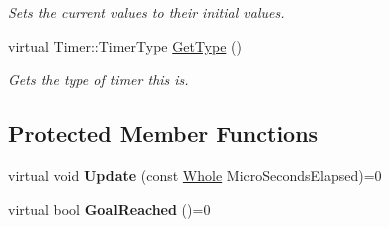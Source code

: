 \begin{DoxyCompactItemize}
\begin{DoxyCompactList}\small\item\em Sets the current values to their initial values. \item\end{DoxyCompactList}\item 
virtual Timer::TimerType \hyperlink{classphys_1_1Timer_af0eaa87bf3074047db36ba1c6fd33c70}{GetType} ()
\begin{DoxyCompactList}\small\item\em Gets the type of timer this is. \item\end{DoxyCompactList}\end{DoxyCompactItemize}
\subsection*{Protected Member Functions}
\begin{DoxyCompactItemize}
\item 
\hypertarget{classphys_1_1Timer_a45d7e290f9cb8c03f2376e48ff794f24}{
virtual void {\bfseries Update} (const \hyperlink{namespacephys_a460f6bc24c8dd347b05e0366ae34f34a}{Whole} MicroSecondsElapsed)=0}
\label{d3/d83/classphys_1_1Timer_a45d7e290f9cb8c03f2376e48ff794f24}

\item 
\hypertarget{classphys_1_1Timer_a636d546064abe43b1c549efaca777613}{
virtual bool {\bfseries GoalReached} ()=0}
\label{d3/d83/classphys_1_1Timer_a636d546064abe43b1c549efaca777613}

\end{DoxyCompactItemize}
